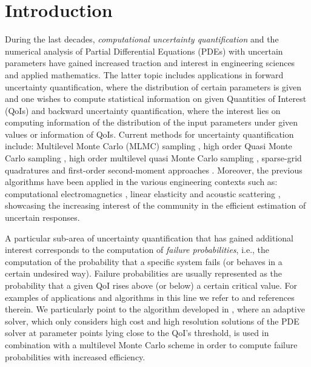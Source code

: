 \documentclass{article}
\theoremstyle{definition}
\begin{document}
\section{Introduction}
\label{sec:Intro}
During the last decades, \emph{computational uncertainty quantification} and the numerical analysis of Partial
Differential Equations (PDEs) with uncertain parameters have gained increased traction and interest in
engineering sciences and applied mathematics. The latter topic includes applications in forward uncertainty quantification,
where the distribution of certain parameters is given and one wishes to compute statistical information on given Quantities
of Interest (QoIs) and backward uncertainty quantification, where the interest lies on computing information of the
distribution of the input parameters under given values or information of QoIs. Current methods for uncertainty
quantification include: Multilevel Monte Carlo (MLMC) sampling \cite{barthMultilevelMonteCarlo2011,gilesMultilevelNestedSimulation2019},
high order Quasi Monte Carlo sampling \cite{gantnerComputationalHigherOrder2016}, high order multilevel quasi Monte Carlo sampling
\cite{dickMultilevelHigherorderQuasiMonte2017}, sparse-grid quadratures \cite{zechMultilevelApproximationParametric2019} and first-order
second-moment approaches \cite{harbrechtSparseSecondMoment2008,vonpetersdorffSparseFiniteElement2006}. Moreover, the previous algorithms
have been applied in the various engineering contexts such as: computational electromagnetics
\cite{aylwinDomainUncertaintyQuantification2020,aylwinMultilevelDomainUncertainty2023,dolzShapeUncertaintyQuantification2024,silva-oelkerQuantifyingImpactRandom2018},
linear elasticity \cite{fittUncertaintyQuantificationElastic2019,harbrechtQuantifyingDomainUncertainty2024} and acoustic scattering
\cite{dolzPMultilevelMonteCarlo2025,hiptmairLargeDeformationShape2018}, showcasing the increasing interest of the community in the
efficient estimation of uncertain responses.

A particular sub-area of uncertainty quantification that has gained additional interest corresponds to the computation of
\emph{failure probabilities}, i.e., the computation of the probability that a specific system fails (or behaves in a certain undesired
way). Failure probabilities are usually represented as the probability that a given QoI rises above (or below) a certain critical value. For examples of applications
and algorithms in this line we refer to
\cite{auEstimationSmallFailure2001,dasguptaFailureProbabilityEstimation2019,delmoralGenealogicalParticleAnalysis2005,elfversonMultilevelMonteCarlo2016,gobetRareEventSimulation2015,haji-aliAdaptiveMultilevelMonte2022,jiaDensityExtrapolationApproach2021,wagnerMultilevelSequentialImportance2020} and references therein. We particularly point to the algorithm developed in
\cite{haji-aliAdaptiveMultilevelMonte2022}, where an adaptive solver, which only considers high cost and high resolution
solutions of the PDE solver at parameter points lying close to the QoI's threshold, is used in combination with a multilevel
Monte Carlo scheme in order to compute failure probabilities with increased efficiency.
\end{document}
